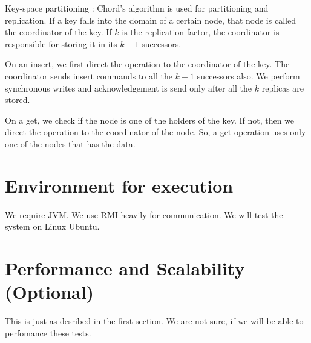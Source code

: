 \documentclass {article}
\begin{document}
Key-space partitioning : Chord's algorithm is used for partitioning and replication. If a key falls into the domain of a certain node, that node is called the coordinator of the key. If $k$ is the replication factor, the coordinator is responsible for storing it in its $k-1$ successors.

On an insert, we first direct the operation to the coordinator of the key. The coordinator sends insert commands to all the $k-1$ successors also. We perform synchronous writes and acknowledgement is send only after all the $k$ replicas are stored.

On a get, we check if the node is one of the holders of the key. If not, then we direct the operation to the coordinator of the node. So, a get operation uses only one of the nodes that has the data.

\section {Environment for execution}
We require JVM. We use RMI heavily for communication. We will test the system on Linux Ubuntu.

\section {Performance and Scalability (Optional)}
This is just as desribed in the first section. We are not sure, if we will be able to perfomance these tests.
\end{document}
